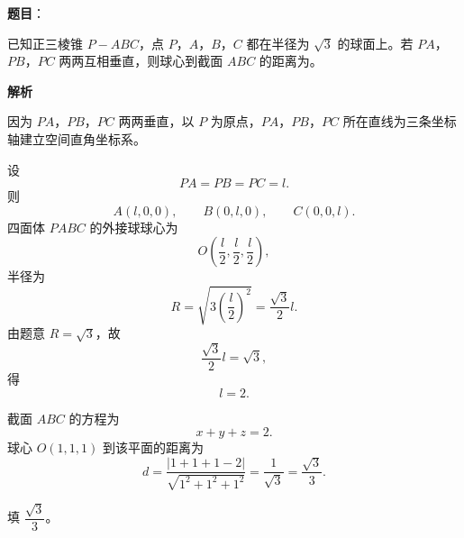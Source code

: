 \begin{answer}

\textbf{题目}：

已知正三棱锥 $P-ABC$，点 $P$，$A$，$B$，$C$ 都在半径为 $\sqrt3$ 的球面上。若 $PA$，$PB$，$PC$ 两两互相垂直，则球心到截面 $ABC$ 的距离为\gkblank{}。

\textbf{解析}

因为 $PA$，$PB$，$PC$ 两两垂直，以 $P$ 为原点，$PA$，$PB$，$PC$ 所在直线为三条坐标轴建立空间直角坐标系。

设
\nopagebreak[4]
\[PA=PB=PC=l.\]
则
\nopagebreak[4]
\[A(l,0,0),\qquad B(0,l,0),\qquad C(0,0,l).\]
四面体 $PABC$ 的外接球球心为
\nopagebreak[4]
\[O\left(\frac l2,\frac l2,\frac l2\right),\]
半径为
\nopagebreak[4]
\[R=\sqrt{3\left(\frac l2\right)^2}=\frac{\sqrt3}{2}l.\]
由题意 $R=\sqrt3$，故
\nopagebreak[4]
\[\frac{\sqrt3}{2}l=\sqrt3,\]
得
\nopagebreak[4]
\[l=2.\]

截面 $ABC$ 的方程为
\nopagebreak[4]
\[x+y+z=2.\]
球心 $O(1,1,1)$ 到该平面的距离为
\nopagebreak[4]
\[d=\frac{|1+1+1-2|}{\sqrt{1^2+1^2+1^2}}
=\frac1{\sqrt3}=\frac{\sqrt3}{3}.\]

填 $\dfrac{\sqrt3}{3}$。


\end{answer}
